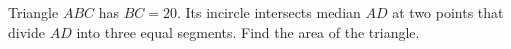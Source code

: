 Triangle $ABC$ has $BC=20$. Its incircle intersects median $AD$ at two points that divide $AD$ into three equal segments. Find the area of the triangle.
